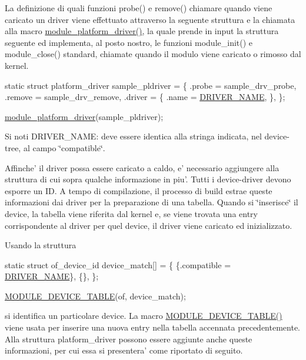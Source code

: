 La definizione di quali funzioni probe() e remove() chiamare quando viene caricato un driver viene effettuato attraverso la seguente struttura e la chiamata alla macro \hyperlink{my_g_p_i_o_k_8c_a61e890be90fe5582db8048893ca0ebbf}{module\+\_\+platform\+\_\+driver()}, la quale prende in input la struttura seguente ed implementa, al posto nostro, le funzioni module\+\_\+init() e module\+\_\+close() standard, chiamate quando il modulo viene caricato o rimosso dal kernel.


\begin{DoxyCode}
\textcolor{keyword}{static} \textcolor{keyword}{struct }platform\_driver sample\_pldriver = \{
    .probe  = sample\_drv\_probe,
    .remove = sample\_drv\_remove,
    .driver = \{
        .name  = \hyperlink{group___kernel-_module_ga25634d21648ca7fb7a2aca614bafaaeb}{DRIVER\_NAME},
    \},
\};

\hyperlink{my_g_p_i_o_k_8c_a61e890be90fe5582db8048893ca0ebbf}{module\_platform\_driver}(sample\_pldriver);
\end{DoxyCode}


Si noti D\+R\+I\+V\+E\+R\+\_\+\+N\+A\+M\+E\+: deve essere identica alla stringa indicata, nel device-\/tree, al campo \char`\"{}compatible\char`\"{}.

Affinche' il driver possa essere caricato a caldo, e' necessario aggiungere alla struttura di cui sopra qualche informazione in piu'. Tutti i device-\/driver devono esporre un I\+D. A tempo di compilazione, il processo di build estrae queste informazioni dai driver per la preparazione di una tabella. Quando si \char`\"{}inserisce\char`\"{} il device, la tabella viene riferita dal kernel e, se viene trovata una entry corrispondente al driver per quel device, il driver viene caricato ed inizializzato.

Usando la struttura


\begin{DoxyCode}
\textcolor{keyword}{static} \textcolor{keyword}{struct }of\_device\_id device\_match[] = \{
        \{.compatible = \hyperlink{group___kernel-_module_ga25634d21648ca7fb7a2aca614bafaaeb}{DRIVER\_NAME}\},
        \{\},
\};

\hyperlink{my_g_p_i_o_k_8c_a4982cc224a0881ae5d106fce7526fb68}{MODULE\_DEVICE\_TABLE}(of, device\_match);
\end{DoxyCode}


si identifica un particolare device. La macro \hyperlink{my_g_p_i_o_k_8c_a4982cc224a0881ae5d106fce7526fb68}{M\+O\+D\+U\+L\+E\+\_\+\+D\+E\+V\+I\+C\+E\+\_\+\+T\+A\+B\+L\+E()} viene usata per inserire una nuova entry nella tabella accennata precedentemente. Alla struttura platform\+\_\+driver possono essere aggiunte anche queste informazioni, per cui essa si presentera' come riportato di seguito.


